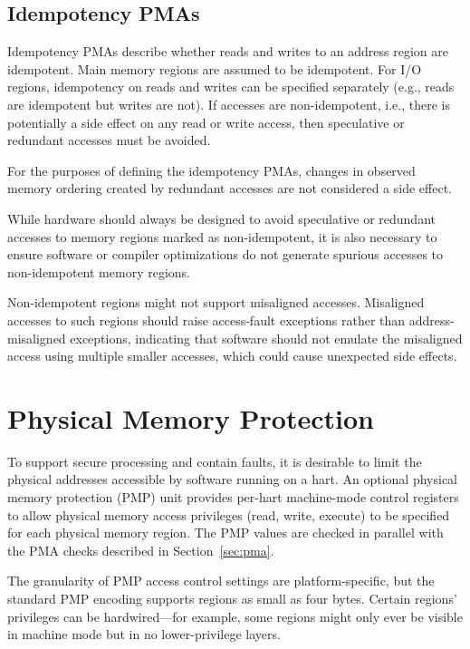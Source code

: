 \subsection{Idempotency PMAs}

Idempotency PMAs describe whether reads and writes to an address
region are idempotent.  Main memory regions are assumed to be
idempotent.  For I/O regions, idempotency on reads and writes can be
specified separately (e.g., reads are idempotent but writes are not).
If accesses are non-idempotent, i.e., there is potentially a side
effect on any read or write access, then speculative or redundant
accesses must be avoided.

For the purposes of defining the idempotency PMAs, changes in observed
memory ordering created by redundant accesses are not considered a
side effect.

\begin{commentary}
While hardware should always be designed to avoid speculative or
redundant accesses to memory regions marked as non-idempotent, it is
also necessary to ensure software or compiler optimizations do not
generate spurious accesses to non-idempotent memory regions.
\end{commentary}

\begin{commentary}
Non-idempotent regions might not support misaligned accesses.  Misaligned
accesses to such regions should raise access-fault exceptions rather than
address-misaligned exceptions, indicating that software should not emulate the
misaligned access using multiple smaller accesses, which could cause
unexpected side effects.
\end{commentary}

\section{Physical Memory Protection}
\label{sec:pmp}

To support secure processing and contain faults, it is desirable to
limit the physical addresses accessible by software running on a hart.
An optional physical memory protection (PMP) unit provides
per-hart machine-mode control registers to allow
physical memory access privileges (read, write, execute) to be
specified for each physical memory region.  The PMP values are checked
in parallel with the PMA checks described in Section~\ref{sec:pma}.

The granularity of PMP access control settings are platform-specific,
but the standard PMP
encoding supports regions as small as four bytes.  Certain regions' privileges
can be hardwired---for example, some regions might only ever be visible in
machine mode but in no lower-privilege layers.


